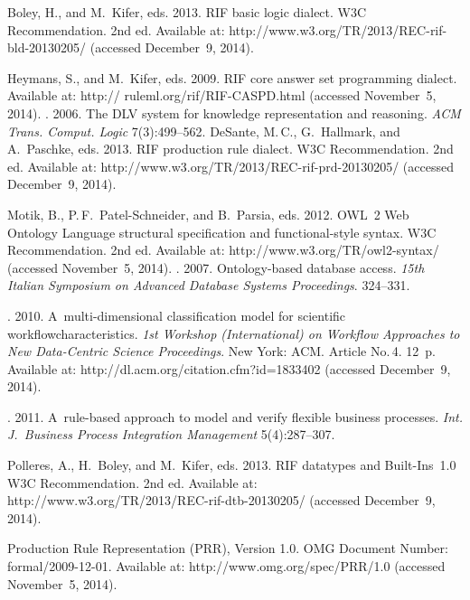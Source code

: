 \begin{multicols}{2}
{{\begin{thebibliography}{99}
Boley, H., and M.~Kifer, eds. 2013. {RIF basic logic dialect. W3C Recommendation}.
2nd ed. Available at:
{\sf http://www.w3.org/TR/2013/REC-rif-bld-20130205/}
(accessed December~9, 2014).


Heymans, S., and M.~Kifer, eds. 2009. {RIF core answer set programming dialect}.
Available at: {\sf http:// ruleml.org/rif/RIF-CASPD.html} (accessed November~5, 2014).
.
2006. The DLV system for knowledge representation and reasoning. \textit{ACM Trans.
Comput. Logic} 7(3):499--562.
DeSante, M.\,C., G.~Hallmark, and A.~Paschke, eds. 2013. {RIF production rule
dialect. W3C Recommendation}. 2nd ed.
Available at: {\sf http://www.w3.org/TR/2013/REC-rif-prd-20130205/}
(accessed December~9, 2014).

Motik, B., P.\,F.~Patel-Schneider, and B.~Parsia, eds.
2012. {OWL~2 Web Ontology Language structural
specification and functional-style syntax. W3C Recommendation}. 2nd ed.
Available at:
{\sf http://www.w3.org/TR/owl2-syntax/} (accessed November~5, 2014).
.
 2007. Ontology-based database access. \textit{15th
Italian Symposium on Advanced Database Systems Proceedings}. 324--331.

. 2010. A~multi-dimensional classification model for
scientific workflow\linebreak characteristics. \textit{1st Workshop (International) on Workflow
Approaches to New Data-Centric Science Proceedings}. New York: ACM.
Article No.\,4. 12~p.
Available at: {\sf http://dl.acm.org/citation.cfm?id=1833402}\linebreak
(accessed December~9, 2014).

. 2011.
A~rule-based approach to model and verify flexible business processes. \textit{Int.
J.~Business Process Integration Management} 5(4):287--307.

Polleres, A., H.~Boley, and M.~Kifer, eds. 2013. {RIF datatypes and Built-Ins~1.0
W3C Recommendation.} 2nd ed.
Available at: {\sf http://www.w3.org/TR/2013/REC-rif-dtb-20130205/}
(accessed December~9, 2014).




Production Rule Representation (PRR), Version 1.0. OMG Document Number:
formal/2009-12-01. Available at: {\sf http://www.omg.org/spec/PRR/1.0} (accessed
November~5, 2014).


\end{thebibliography}}}
\end{multicols}
